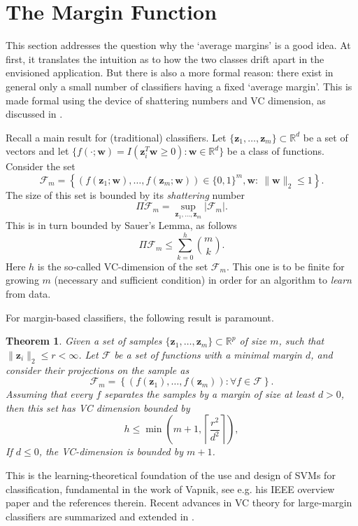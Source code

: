 \documentclass[12pt,a4paper]{article}%
\newtheorem{Theorem}{Theorem}
\newcommand{\R}{\mathbb{R}}
\newcommand{\wv}{\mathbf{w}}
\newcommand{\zv}{\mathbf{z}}
\begin{document}
\section{The Margin Function}

This section addresses the question why the `average margins' is a good idea.
At first, it translates the intuition as to how the two classes drift apart in the envisioned application.
But there is also a more formal reason:
there exist in general only a small number of classifiers having a fixed `average margin'.
This is made formal using the device of shattering numbers and VC dimension, as discussed in \cite{vapnik1999overview, sabato2013distribution}.

Recall a main result for (traditional) classifiers.
Let $\{\zv_1, \dots, \zv_m\}\subset\R^d$ be a set of vectors
and let $\{f(\cdot; \wv)=I(\zv_i^T\wv \geq 0): \wv\in\R^d\}$ be a class of functions.
Consider the set
\begin{equation}
	\mathcal{F}_m =  \left\{\left(f(\zv_1;\wv), \dots,  f(\zv_m;\wv)\right)\in\{0,1\}^m, \wv: \  \|\wv\|_2\leq 1\right\}.
	\label{eq.F}
\end{equation}
The size of this set is bounded by its {\em shattering} number
\begin{equation}
	\Pi\mathcal{F}_m = \sup_{\zv_1, \dots, \zv_m} |\mathcal{F}_m|.
	\label{eq.F}
\end{equation}
This is in turn bounded by Sauer's Lemma, as follows
\begin{equation}
	\Pi\mathcal{F}_m \leq \sum_{k=0}^{h} {m \choose k}.
	\label{eq.F}
\end{equation}
Here $h$ is the so-called VC-dimension of the set $\mathcal{F}_m$.
This one is to be finite for growing $m$ (necessary and sufficient condition)
in order for an algorithm to {\em learn} from data.

For margin-based classifiers, the following result is paramount.
\begin{Theorem}
	Given a set of samples $\{\zv_1, \dots, \zv_m\}\subset\R^p$ of size $m$,
	such that  $\|\zv_i\|_2\leq r<\infty$.
	Let $\mathcal{F}$ be a set of functions with a minimal margin $d$,
	and consider their projections on the sample as
	\begin{equation}
		\mathcal{F}_m =  \left\{\left(f(\zv_1), \dots,  f(\zv_m)\right): \forall f\in\mathcal{F}\right\}.
		\label{eq.F}
	\end{equation}
	Assuming that every $f$ separates the samples by a margin of size at least $d>0$,
	then this set has VC dimension bounded by
	\begin{equation}
		h \leq \min\left(m+1, \left\lceil\frac{r^2}{d^2}\right\rceil\right),
		\label{radiusmargin}
	\end{equation}	
	If $d\leq 0$, the VC-dimension is bounded by $m+1$.
\end{Theorem}
This is the learning-theoretical foundation of the use and design of SVMs for classification,
fundamental in the work of Vapnik, see e.g. his IEEE overview paper \cite{vapnik1999overview}
and the references therein.
Recent advances in VC theory for large-margin classifiers are summarized and extended in
\cite{sabato2013distribution}.
\end{document}
